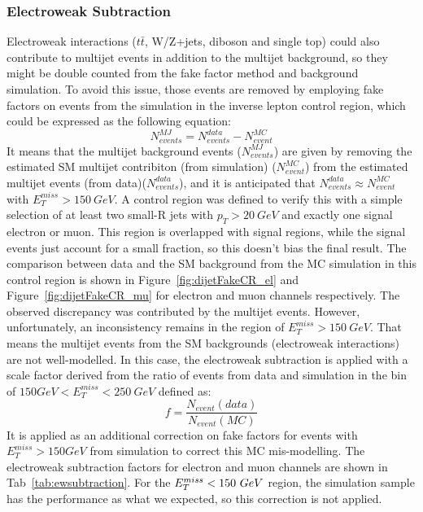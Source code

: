 \subsubsection*{Electroweak Subtraction}
Electroweak interactions ($t\bar{t}$, W/Z+jets, diboson and single top) could also contribute to multijet events in addition to the multijet background, so they might be double counted from the fake factor method and background simulation. To avoid this issue, those events are removed by employing fake factors on events from the simulation in the inverse lepton control region, which could be expressed as the following equation:
\begin{equation}
 N^{MJ}_{events} = N^{data}_{events}-N^{MC}_{event}
\end{equation}
It means that the multijet background events ($N^{MJ}_{events}$) are given by removing the estimated SM multijet contribiton (from simulation) ($N^{MC}_{event}$) from the estimated multijet events (from data)($N^{data}_{events}$), and it is anticipated that $N^{data}_{events}\approx N^{MC}_{event}$ with $E^{miss}_{T}>150~GeV$. A control region was defined to verify this with a simple selection of at least two small-R jets with $p_{T}>20~GeV$ and exactly one signal electron or muon. This region is overlapped with signal regions, while the signal events just account for a small fraction, so this doesn't bias the final result. The comparison between data and the SM background from the MC simulation in this control region is shown in Figure~\ref{fig:dijetFakeCR_el} and Figure~\ref{fig:dijetFakeCR_mu} for electron and muon channels respectively. The observed discrepancy was contributed by the multijet events. However, unfortunately, an inconsistency remains in the region of $E_{T}^{miss}>150~GeV$. That means the multijet events from the SM backgrounds (electroweak interactions) are not well-modelled. In this case, the electroweak subtraction is applied with a scale factor derived from the ratio of events from data and simulation in the bin of $150 GeV<E^{miss}_{T}<250~GeV$ defined as: 
\begin{equation}
f = \frac{N_{event}(data)}{N_{event}(MC)}
\end{equation}
It is applied as an additional correction on fake factors for events with $E_{T}^{miss}>150 GeV$ from simulation to correct this MC mis-modelling. The electroweak subtraction factors for electron and muon channels are shown in Tab~\ref{tab:ewsubtraction}. For the $E_{T}^{miss}<150~GeV$ region, the simulation sample has the performance as what we expected, so this correction is not applied. 


